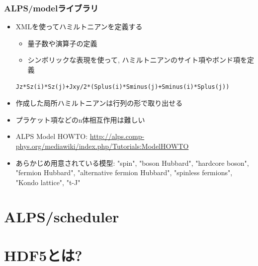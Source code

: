 \begin{frame}[t,fragile]
  \frametitle{ALPS/modelライブラリ}
  \begin{itemize}
  \item XMLを使ってハミルトニアンを定義する
    \begin{itemize}  
    \item 量子数や演算子の定義
    \item シンボリックな表現を使って, ハミルトニアンのサイト項やボンド項を定義
    \end{itemize}
    \begin{lstlisting}
Jz*Sz(i)*Sz(j)+Jxy/2*(Splus(i)*Sminus(j)+Sminus(i)*Splus(j))
\end{lstlisting}
  \item 作成した局所ハミルトニアンは行列の形で取り出せる
  \item プラケット項などのn体相互作用は難しい
  \item ALPS Model HOWTO: \url{http://alps.comp-phys.org/mediawiki/index.php/Tutorials:ModelHOWTO}
  \item あらかじめ用意されている模型: "spin", "boson Hubbard", "hardcore boson", "fermion Hubbard", "alternative fermion Hubbard", "spinless fermions", "Kondo lattice", "t-J"
  \end{itemize}
\end{frame}

\section{ALPS/scheduler}
\section{HDF5とは?}


